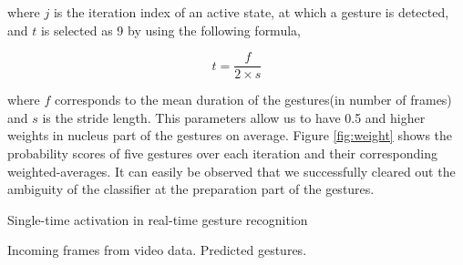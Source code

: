 \noindent where $j$ is the iteration index of an active state, at which a gesture is detected, and $t$ is selected as 9 by using the following formula,

\begin{equation}
    t = \frac{f}{2 \times s}
\end{equation}

\noindent where $f$ corresponds to the mean duration of the gestures(in number of frames) and $s$ is the stride length. This parameters allow us to have 0.5 and higher weights in nucleus part of the gestures on average. Figure \ref{fig:weight} shows the probability scores of five gestures over each iteration and their corresponding weighted-averages. It can easily be observed that we successfully cleared out the ambiguity of the classifier at the preparation part of the gestures.\\
\begin{algorithm}[t!]
	\renewcommand{\algorithmicrequire}{\textbf{Input:}}
	\renewcommand{\algorithmicensure}{\textbf{Output:}}
	\caption{Single-time activation in real-time gesture recognition }
    \centering
	\label{online_testing}
	\begin{algorithmic}[1]
		\Require Incoming frames from video data.
		\Ensure Predicted gestures.
        \State {}
        \EndIf
        \EndIf
        \State {}
        \EndIf
        \EndIf
        \EndFor
	\end{algorithmic}
\end{algorithm}

